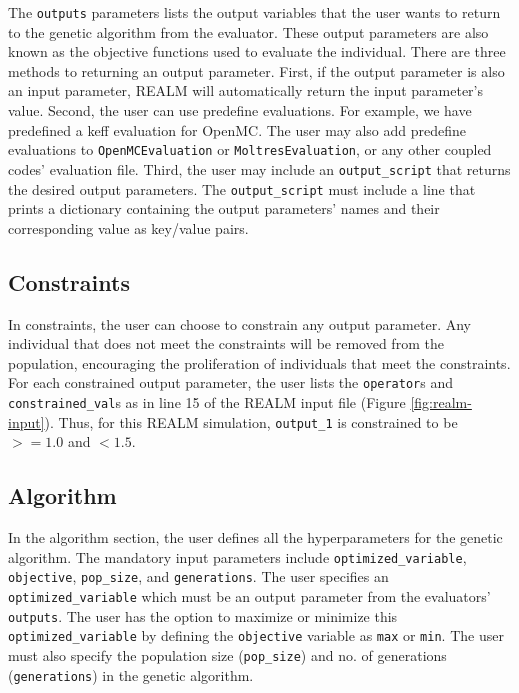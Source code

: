 The \texttt{outputs} parameters lists the output variables that the user 
wants to return to the genetic algorithm from the evaluator. 
These output parameters are also known as the objective functions used to 
evaluate the individual.  
There are three methods to returning an output parameter. 
First, if the output parameter is also an input parameter, REALM will automatically 
return the input parameter's value. 
Second, the user can use predefine evaluations. 
For example, we have predefined a keff evaluation for OpenMC. 
The user may also add predefine evaluations to \texttt{OpenMCEvaluation} or 
\texttt{MoltresEvaluation}, or any other coupled codes' evaluation file.
Third, the user may include an \texttt{output\_script} that returns the desired 
output parameters. 
The \texttt{output\_script} must include a line that prints a dictionary containing 
the output parameters' names and their corresponding value as key/value pairs. 

\subsection{Constraints}
In constraints, the user can choose to constrain any output parameter. 
Any individual that does not meet the constraints will be removed from the 
population, encouraging the proliferation of individuals that meet the 
constraints. 
For each constrained output parameter, the user lists the \texttt{operator}s 
and \texttt{constrained\_val}s as in line 15 of the REALM input file 
(Figure \ref{fig:realm-input}). 
Thus, for this REALM simulation, \texttt{output\_1} is constrained to be 
$>= 1.0$ and $< 1.5$. 

\subsection{Algorithm}

In the algorithm section, the user defines all the hyperparameters for the 
genetic algorithm. 
The mandatory input parameters include \texttt{optimized\_variable}, 
\texttt{objective}, \texttt{pop\_size}, and \texttt{generations}.
The user specifies an \texttt{optimized\_variable} which must be an output 
parameter from the evaluators' \texttt{outputs}. 
The user has the option to maximize or minimize this \texttt{optimized\_variable}
by defining the \texttt{objective} variable as \texttt{max} or \texttt{min}. 
The user must also specify the population size (\texttt{pop\_size}) and no. of 
generations (\texttt{generations}) in the genetic algorithm. 

